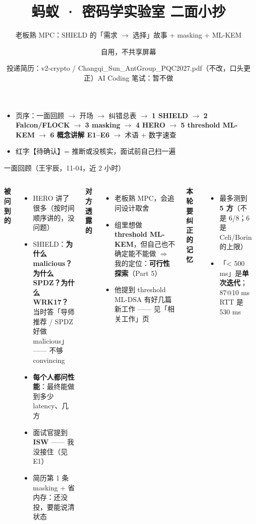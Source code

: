 \documentclass[aspectratio=169,10pt,fontset=none]{ctexbeamer}
\title{蚂蚁 · 密码学实验室 二面小抄}
\subtitle{老板熟 MPC：SHIELD 的「需求 $\to$ 选择」故事 + masking + ML-KEM}
\author{自用，不共享屏幕}
\date{投递简历：v2-crypto / Changqi\_Sun\_AntGroup\_PQC2027.pdf（不改，口头更正）\quad AI Coding 笔试：暂不做}
\begin{document}
\footnotesize

\begin{frame}
\titlepage
\vspace{-1em}
\begin{itemize}
  \item 页序：一面回顾 $\to$ 开场 $\to$ \alert{纠错总表} $\to$ \textbf{1 SHIELD} $\to$ \textbf{2 Falcon/FLOCK} $\to$ \textbf{3 masking} $\to$ \textbf{4 HERO} $\to$ \textbf{5 threshold ML-KEM} $\to$ \textbf{6 概念讲解 E1--E6} $\to$ 术语 + 数字速查
  \item {\color{warn}红字【待确认】}= 推断或没核实，面试前自己扫一遍
\end{itemize}
\end{frame}
\begin{frame}{一面回顾（王宇辰，11-04，近 2 小时）}
\begin{columns}[T]
\textbf{被问到的}
\begin{itemize}
  \item HERO 讲了很多（按时间顺序讲的，没问题）
  \item SHIELD：\textbf{为什么 malicious？为什么 SPDZ？为什么 WRK17？}\\
        \quad 当时答「导师推荐 / SPDZ 好做 malicious」—— \alert{不够 convincing}
  \item \textbf{每个人都问性能}：最终能做到多少 latency、几方
  \item 面试官提到 \textbf{ISW} —— 我没接住（见 E1）
  \item 简历第 1 条 masking + 省内存：还没投，要能说清状态
\end{itemize}
\textbf{对方透露的}
\begin{itemize}
  \item 老板熟 MPC，会追问设计取舍
  \item 组里想做 \textbf{threshold ML-KEM}，但自己也不确定能不能做 $\Rightarrow$ 我的定位：\textbf{可行性探索}（Part 5）
  \item 他提到 threshold ML-DSA 有好几篇新工作 —— 见「相关工作」页
\end{itemize}
\textbf{本轮要纠正的记忆}
\begin{itemize}
  \item 最多测到 \textbf{5 方}（不是 6/8；6 是 Celi/Borin 的上限）
  \item 「< 500 ms」是\textbf{单次迭代}；87@10 ms RTT 是 530 ms
\end{itemize}
\end{columns}
\end{frame}
\end{document}
